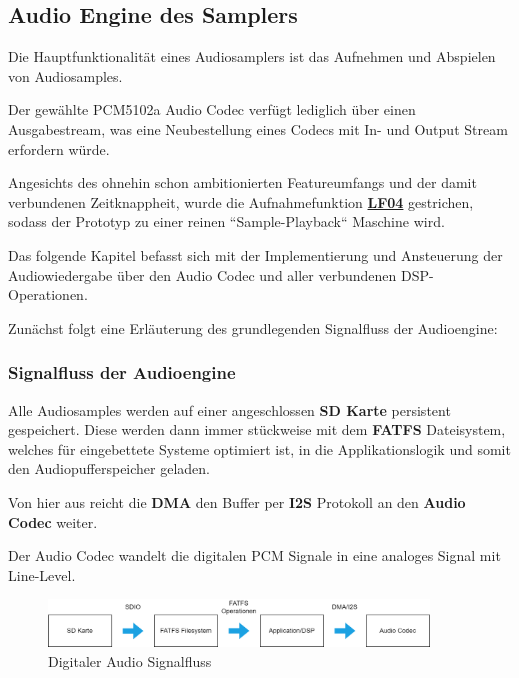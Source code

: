 \subsection{Audio Engine des Samplers}\label{sec:audio-engine}

Die Hauptfunktionalität eines Audiosamplers ist das Aufnehmen und Abspielen von Audiosamples. 

Der gewählte PCM5102a Audio Codec verfügt lediglich über einen Ausgabestream, was eine Neubestellung eines Codecs mit In- und Output Stream erfordern würde.

Angesichts des ohnehin schon ambitionierten Featureumfangs und der damit verbundenen Zeitknappheit, wurde die Aufnahmefunktion \textbf{\hyperlink{lf-audiorecord}{LF04}} gestrichen, sodass der Prototyp zu einer reinen ``Sample-Playback`` Maschine wird. 

Das folgende Kapitel befasst sich mit der Implementierung und Ansteuerung der Audiowiedergabe über den Audio Codec und aller verbundenen DSP-Operationen.

Zunächst folgt eine Erläuterung des grundlegenden Signalfluss der Audioengine:

\subsubsection{Signalfluss der Audioengine}

Alle Audiosamples werden auf einer angeschlossen \textbf{SD Karte} persistent gespeichert. Diese werden dann immer stückweise mit dem \textbf{FATFS} Dateisystem, welches für eingebettete Systeme optimiert ist, in die Applikationslogik und somit den Audiopufferspeicher geladen. 

Von hier aus reicht die \textbf{DMA} den Buffer per \textbf{I2S} Protokoll an den \textbf{Audio Codec} weiter. 

Der Audio Codec wandelt die digitalen PCM Signale in eine analoges Signal mit Line-Level. %

\begin{figure}[h!]
	\centering
	\includegraphics[width=0.9\textwidth]{images/08_durchfuehrung/audio/audio_signalflow.drawio.png}
	\caption{Digitaler Audio Signalfluss}
	\label{fig:audio_signalflow}
\end{figure}


